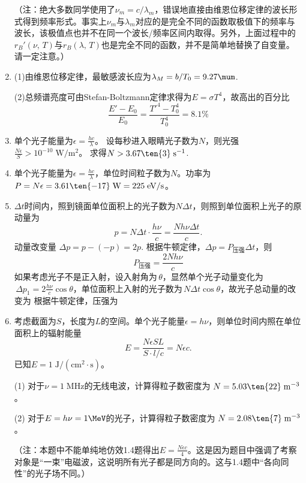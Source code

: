 \begin{enumerate}[label=1.\arabic*]
{\color{red}（注：绝大多数同学使用了$\nu_m = c/\lambda_m$，错误地直接由维恩位移定律的波长形式得到频率形式。事实上$\nu_m$与$\lambda_m$对应的是完全不同的函数取极值下的频率与波长，该极值点也并不在同一个波长/频率区间内取得。另外，上面过程中的$r_B'(\nu,\,T)$与$r_B(\lambda,\,T)$也是完全不同的函数，并不是简单地替换了自变量。请一定注意。）}

\item
(1)由维恩位移定律，最敏感波长应为$\lambda_M= b/T_0 = 9.27\mum$.

(2)总频谱亮度可由Stefan-Boltzmann定律求得为$E=\sigma T^4$，故高出的百分比
\[\frac{E'-E_0}{E_0} = \frac{T'^4-T_0^4}{T_0^4} = 8.1\%\]

\item
单个光子能量为$\epsilon = \frac{hc}{\lambda}$。
设每秒进入眼睛光子数为$N$，则光强$\frac{N\epsilon}{S}>10^{-10}\;\mathrm{W/m^2}$。
求得$N>3.67\ten{3}\;\mathrm{s^{-1}}$.

\item
单个光子能量为$\epsilon = \frac{hc}{\lambda}$，单位时间粒子数为$N$。功率为$P = N\epsilon = 3.61\ten{-17}\;\mathrm{W} = 225\;\mathrm{eV/s}$。

\item
$\Delta t$时间内，照到镜面单位面积上的光子数为$N\Delta t$，则照到单位面积上光子的原动量为
\[p = N\Delta t\cdot \frac{h\nu}{c} = \frac{Nh\nu\Delta t}{c}.\]
动量改变量
$\Delta p = p-(-p) = 2p $.
根据牛顿定律，$\Delta p = P_\text{压强}\Delta t$，则
\[P_\text{压强} = \frac{2Nh\nu}{c}\]
如果考虑光子不是正入射，设入射角为$\,\theta$，显然单个光子动量变化为$\,\Delta p_1=2\frac{h\nu}{c}\cos\theta$，单位面积上入射的光子数为$\,N\Delta t\cos\theta$，故光子总动量的改变为
根据牛顿定律，压强为

\item
考虑截面为$S$，长度为$L$的空间。单个光子能量$\epsilon = h\nu$，则单位时间内照在单位面积上的辐射能量
\[E = \frac{N\epsilon SL}{S\cdot l/c} = N\epsilon c.\]
已知$E=1\;\mathrm{J/(cm^2\cdot s)}$。

(1) 对于$\nu=1\;\mathrm{MHz}$的无线电波，计算得粒子数密度为
$N = 5.03\ten{22}\;\mathrm{m^{-3}}$。

(2) 对于$E=h\nu=1\MeV$的光子，计算得粒子数密度为
$N = 2.08\ten{7}\;\mathrm{m^{-3}}$。

{\color{red}（注：本题中不能单纯地仿效1.4题得出$E = \frac{N\epsilon c}{4}$。这是因为题目中强调了考察对象是“一束”电磁波，这说明所有光子都是同方向的。这与1.4题中“各向同性”的光子场不同。）}


\end{enumerate}
